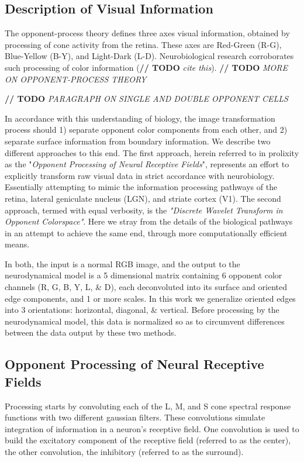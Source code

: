\documentclass[journal,onecolumn]{IEEEtran}
\begin{document}
\subsection*{Description of Visual Information}

The opponent-process theory defines three axes visual information, obtained by processing of cone activity from the retina. These axes are Red-Green (R-G), Blue-Yellow (B-Y), and Light-Dark (L-D). Neurobiological research corroborates such processing of color information (\textbf{// TODO} \textit{cite this}). \textbf{// TODO} \textit{MORE ON OPPONENT-PROCESS THEORY}

\textbf{// TODO} \textit{PARAGRAPH ON SINGLE AND DOUBLE OPPONENT CELLS}

In accordance with this understanding of biology, the image transformation process should 1) separate opponent color components from each other, and 2) separate surface information from boundary information. We describe two different approaches to this end. The first approach, herein referred to in prolixity as the "\textit{Opponent Processing of Neural Receptive Fields}", represents an effort to explicitly transform raw visual data in strict accordance with neurobiology. Essentially attempting to mimic the information processing pathways of the retina, lateral geniculate nucleus (LGN), and striate cortex (V1). The second approach, termed with equal verbosity, is the \textit{"Discrete Wavelet Transform in Opponent Colorspace"}. Here we stray from the details of the biological pathways in an attempt to achieve the same end, through more computationally efficient means.

In both, the input is a normal RGB image, and the output to the neurodynamical model is a 5 dimensional matrix containing 6 opponent color channels (R, G, B, Y, L, \& D), each deconvoluted into its surface and oriented edge components, and 1 or more scales. In this work we generalize oriented edges into 3 orientations: horizontal, diagonal, \& vertical. Before processing by the neurodynamical model, this data is normalized so as to circumvent differences between the data output by these two methods.

\subsection{Opponent Processing of Neural Receptive Fields}

Processing starts by convoluting each of the L, M, and S cone spectral response functions with two different gaussian filters. These convolutions simulate integration of information in a neuron's receptive field. One convolution is used to build the excitatory component of the receptive field (referred to as the center), the other convolution, the inhibitory (referred to as the surround).
\end{document}

